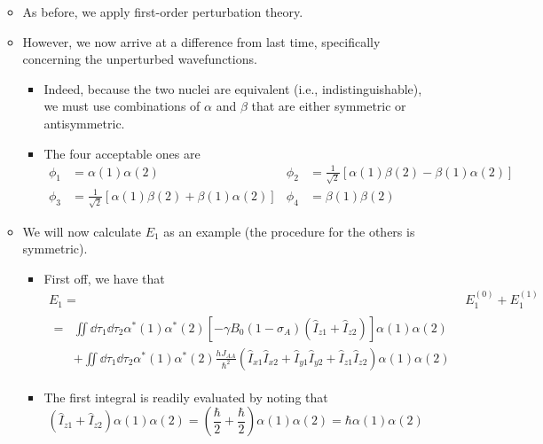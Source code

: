\documentclass[../notes.tex]{subfiles}
\begin{document}
\begin{itemize}
\begin{itemize}
\begin{equation*}
        \end{equation*}
        \item As before, we apply first-order perturbation theory.
        \item However, we now arrive at a difference from last time, specifically concerning the unperturbed wavefunctions.
        \begin{itemize}
            \item Indeed, because the two nuclei are equivalent (i.e., indistinguishable), we must use combinations of $\alpha$ and $\beta$ that are either symmetric or antisymmetric.
            \item The four acceptable ones are
            \begin{align*}
                \phi_1 &= \alpha(1)\alpha(2)&
                \phi_2 &= \frac{1}{\sqrt{2}}[\alpha(1)\beta(2)-\beta(1)\alpha(2)]\\
                \phi_3 &= \frac{1}{\sqrt{2}}[\alpha(1)\beta(2)+\beta(1)\alpha(2)]&
                \phi_4 &= \beta(1)\beta(2)
            \end{align*}
        \end{itemize}
        \item We will now calculate $E_1$ as an example (the procedure for the others is symmetric).
        \begin{itemize}
            \item First off, we have that
            \begin{align*}
                E_1 ={}& E_1^{(0)}+E_1^{(1)}\\
                \begin{split}
                    ={}& \iint\dd{\tau_1}\dd{\tau_2}\alpha^*(1)\alpha^*(2)\left[ -\gamma B_0(1-\sigma_A)(\hat{I}_{z1}+\hat{I}_{z2}) \right]\alpha(1)\alpha(2)\\
                    &+ \iint\dd{\tau_1}\dd{\tau_2}\alpha^*(1)\alpha^*(2)\frac{hJ_{AA}}{\hbar^2}(\hat{I}_{x1}\hat{I}_{x2}+\hat{I}_{y1}\hat{I}_{y2}+\hat{I}_{z1}\hat{I}_{z2})\alpha(1)\alpha(2)
                \end{split}
            \end{align*}
            \item The first integral is readily evaluated by noting that
            \begin{equation*}
                (\hat{I}_{z1}+\hat{I}_{z2})\alpha(1)\alpha(2) = \left( \frac{\hbar}{2}+\frac{\hbar}{2} \right)\alpha(1)\alpha(2)
                = \hbar\alpha(1)\alpha(2)
            \end{equation*}

\end{itemize}
\end{itemize}
\end{itemize}
\end{document}
